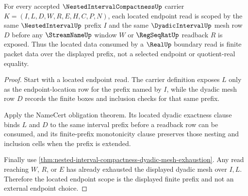 \begin{theorem}
\label{thm:nested-interval-compactness-located-dyadic-scope}
For every accepted $\NestedIntervalCompactnessUp$ carrier $K=(I,L,D,W,R,E,H,C,P,N)$, each located endpoint read is scoped by the same $\NestedIntervalUp$ prefix $I$ and the same $\DyadicIntervalUp$ mesh row $D$ before any $\StreamNameUp$ window $W$ or $\RegSeqRatUp$ readback $R$ is exposed. Thus the located data consumed by a $\RealUp$ boundary read is finite packet data over the displayed prefix, not a selected endpoint or quotient-real equality.
\end{theorem}
\begin{proof}
Start with a located endpoint read. The carrier definition exposes $L$ only as the endpoint-location row for the prefix named by $I$, while the dyadic mesh row $D$ records the finite boxes and inclusion checks for that same prefix.

Apply the NameCert obligation theorem. Its located dyadic exactness clause binds $L$ and $D$ to the same interval prefix before a readback row can be consumed, and its finite-prefix monotonicity clause preserves those nesting and inclusion cells when the prefix is extended.

Finally use \autoref{thm:nested-interval-compactness-dyadic-mesh-exhaustion}. Any read reaching $W$, $R$, or $E$ has already exhausted the displayed dyadic mesh over $I,L$. Therefore the located endpoint scope is the displayed finite prefix and not an external endpoint choice.
\end{proof}

